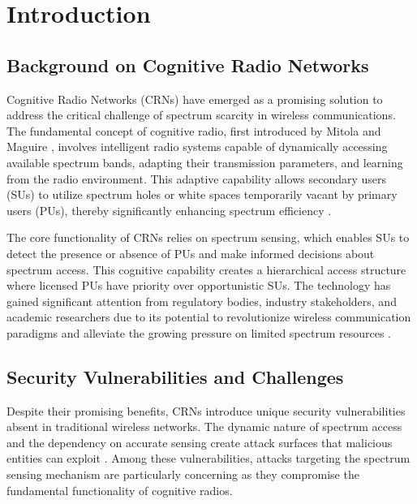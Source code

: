 

\chapter{Introduction}

\section{\texorpdfstring{\large\textbf{Background on Cognitive Radio Networks}}{Background on Cognitive Radio Networks}}

Cognitive Radio Networks (CRNs) have emerged as a promising solution to address the critical challenge of spectrum scarcity in wireless communications. The fundamental concept of cognitive radio, first introduced by Mitola and Maguire \cite{mitola1999cognitive}, involves intelligent radio systems capable of dynamically accessing available spectrum bands, adapting their transmission parameters, and learning from the radio environment. This adaptive capability allows secondary users (SUs) to utilize spectrum holes or white spaces temporarily vacant by primary users (PUs), thereby significantly enhancing spectrum efficiency \cite{akyildiz2006next}.

The core functionality of CRNs relies on spectrum sensing, which enables SUs to detect the presence or absence of PUs and make informed decisions about spectrum access. This cognitive capability creates a hierarchical access structure where licensed PUs have priority over opportunistic SUs. The technology has gained significant attention from regulatory bodies, industry stakeholders, and academic researchers due to its potential to revolutionize wireless communication paradigms and alleviate the growing pressure on limited spectrum resources \cite{haykin2005cognitive}.

\section{\texorpdfstring{\large\textbf{Security Vulnerabilities and Challenges}}{Security Vulnerabilities and Challenges}}

Despite their promising benefits, CRNs introduce unique security vulnerabilities absent in traditional wireless networks. The dynamic nature of spectrum access and the dependency on accurate sensing create attack surfaces that malicious entities can exploit \cite{clancy2007security, wang2010security}. Among these vulnerabilities, attacks targeting the spectrum sensing mechanism are particularly concerning as they compromise the fundamental functionality of cognitive radios.

